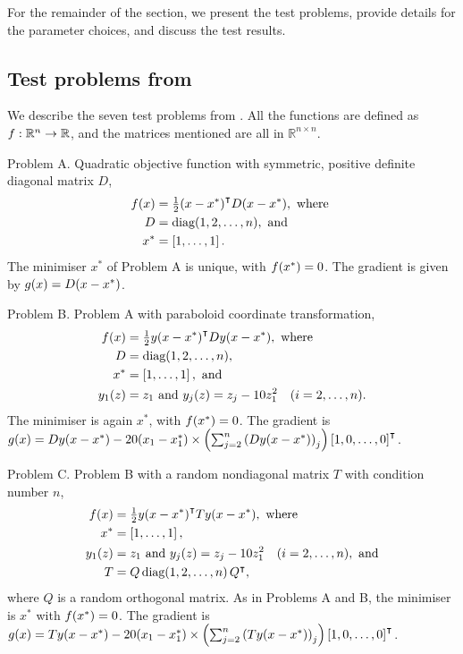 \documentclass[main.tex]{subfiles}
\begin{document}
For the remainder of the section, we present the test problems,
provide details for the parameter choices, and discuss the test
results.

\subsection{Test problems from \citeauthor{sterck2013steepest}}\label{subsec:test_problems_sterck}
We describe the seven test problems from \citet{sterck2013steepest}.
All the functions are defined as $f:\mathbb{R}^n\to\mathbb{R}$, and
the matrices mentioned are all in $\mathbb{R}^{n\times n}$.

Problem A. Quadratic objective function with symmetric, positive
definite diagonal matrix $D$,
\begin{align}
  \begin{split}
    f(x)&= {\textstyle\frac{1}{2}}{(x-x^*)}^\intercal D(x-x^*),\text{ where }\\
    D&=\mbox{diag}(1,2,\dots,n), \text{ and }\\
    x^*&=\left[1,\dots,1\right].
  \end{split}
\end{align}
The minimiser $x^*$ of Problem A is unique, with $f(x^*)=0$. The
gradient is given by $g(x)=D(x-x^*)$.

Problem B. Problem A with paraboloid coordinate transformation,
\begin{align}
  \begin{split}
    f(x)&= {\textstyle\frac{1}{2}}{y(x-x^*)}^\intercal Dy(x-x^*),\text{ where }\\
    D&=\mbox{diag}(1,2,\dots,n),\\
    x^*&=\left[1,\dots,1\right], \text{ and }\\
    y_1(z)&=z_1 \text{ and } y_j(z)=z_j-10z_1^2 \quad (i=2,\dots,n).
  \end{split}
\end{align}
The minimiser is again $x^*$, with $f(x^*)=0$. The gradient is
$g(x) = Dy(x-x^*) - 20(x_1-x_1^*) \times \left(
  \sum_{j=2}^n{(Dy(x-x^*))}_j \right)
\left[1,0,\dots,0\right]^\intercal$.

Problem C. Problem B with a random nondiagonal matrix $T$ with
condition number $n$,
\begin{align}
  \begin{split}
    f(x)&={\textstyle\frac{1}{2}}{y(x-x^*)}^\intercal Ty(x-x^*),\text{ where }\\
    x^*&=\left[1,\dots,1\right],\\
    y_1(z)&=z_1 \text{ and } y_j(z)=z_j-10z_1^2 \quad (i=2,\dots,n),
    \text { and}\\
    T&=Q\,\mbox{diag}(1,2,\dots,n)\,Q^\intercal,
  \end{split}
\end{align}
where $Q$ is a random orthogonal matrix.  As in Problems A and B, the
minimiser is $x^*$ with $f(x^*)=0$. The gradient is
$g(x) = Ty(x-x^*) - 20(x_1-x_1^*) \times \left(
  \sum_{j=2}^n{(Ty(x-x^*))}_j \right)
\left[1,0,\dots,0\right]^\intercal$.
\end{document}
